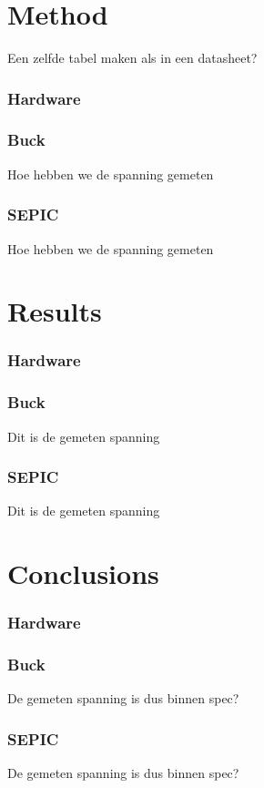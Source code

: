 \section{Method}
Een zelfde tabel maken als in een datasheet?

\subsubsection{Hardware}
\subsubsection{Buck}
Hoe hebben we de spanning gemeten

\subsubsection{SEPIC}
Hoe hebben we de spanning gemeten

\section{Results}

\subsubsection{Hardware}
\subsubsection{Buck}
Dit is de gemeten spanning

\subsubsection{SEPIC}
Dit is de gemeten spanning

\section{Conclusions}

\subsubsection{Hardware}
\subsubsection{Buck}
De gemeten spanning is dus binnen spec?

\subsubsection{SEPIC}
De gemeten spanning is dus binnen spec?